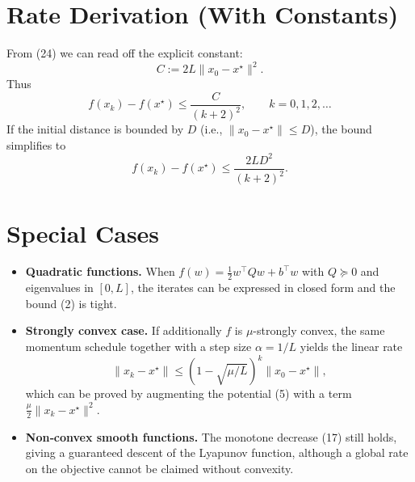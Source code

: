 \documentclass{article}
\begin{document}
\section*{Rate Derivation (With Constants)}
From (24) we can read off the explicit constant:
\[
C := 2L\|x_0-x^\star\|^2 .
\]
Thus
\[
f(x_k)-f(x^\star) \le \frac{C}{(k+2)^2},
\qquad k=0,1,2,\dots
\]
If the initial distance is bounded by \(D\) (i.e., \(\|x_0-x^\star\|\le D\)), the bound simplifies to
\[
f(x_k)-f(x^\star) \le \frac{2LD^2}{(k+2)^2}.
\]

\section*{Special Cases}
\begin{itemize}
\item \textbf{Quadratic functions.}  When \(f(w)=\frac{1}{2}w^\top Q w+b^\top w\) with \(Q\succeq 0\) and eigenvalues in \([0,L]\), the iterates can be expressed in closed form and the bound (2) is tight.
\item \textbf{Strongly convex case.}  If additionally \(f\) is \(\mu\)-strongly convex, the same momentum schedule together with a step size \(\alpha=1/L\) yields the linear rate
\[
\|x_k-x^\star\|\le \left(1-\sqrt{\mu/L}\right)^k\|x_0-x^\star\|,
\]
which can be proved by augmenting the potential (5) with a term \(\frac{\mu}{2}\|x_k-x^\star\|^2\).
\item \textbf{Non‑convex smooth functions.}  The monotone decrease (17) still holds, giving a guaranteed descent of the Lyapunov function, although a global rate on the objective cannot be claimed without convexity.
\end{itemize}
\end{document}
